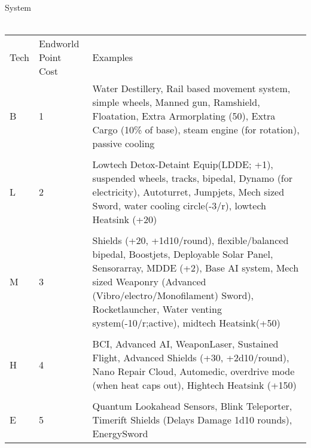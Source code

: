 \documentclass{article}
\begin{document}
System\\\\
\begin{tabularx}{17cm}{m{0.7cm}|m{1.4cm}|m{14cm}}
	Tech	& Endworld Point Cost	& Examples\\
	B	&	1		&	Water Destillery, Rail based movement system, simple wheels, Manned gun, Ramshield, Floatation,
	                    Extra Armorplating (50), Extra Cargo (10\% of base), steam engine (for rotation), passive cooling\\&&\\
	L	&	2		&	Lowtech Detox-Detaint Equip(LDDE; +1), suspended wheels, tracks, bipedal, Dynamo (for electricity),
	                    Autoturret, Jumpjets, Mech sized Sword, water cooling circle(-3/r), lowtech Heatsink (+20)\\&&\\
	M	&	3		&	Shields (+20, +1d10/round), flexible/balanced bipedal, Boostjets, Deployable Solar Panel, Sensorarray,
	                    MDDE (+2), Base AI system, Mech sized Weaponry (Advanced (Vibro/electro/Monofilament) Sword),
	                    Rocketlauncher, Water venting system(-10/r;active), midtech Heatsink(+50)\\&&\\
	H	&	4		&	BCI, Advanced AI, WeaponLaser, Sustained Flight,  Advanced Shields (+30, +2d10/round),
						Nano Repair Cloud, Automedic, overdrive mode (when heat caps out), Hightech Heatsink (+150)\\&&\\
	E	&	5		&	Quantum Lookahead Sensors, Blink Teleporter, Timerift Shields (Delays Damage 1d10 rounds), EnergySword
\end{tabularx}\\\\[12mm]
\end{document}
